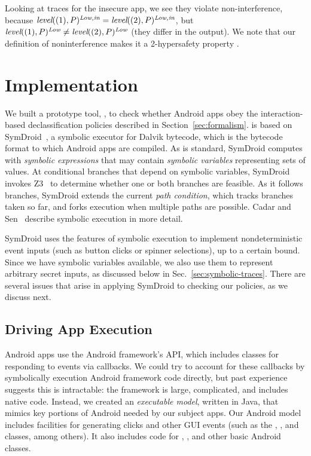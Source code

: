Looking at traces for the insecure app, we see
they violate non-interference, because
$\textit{level}((1), P)^\textit{Low,in} =
\textit{level}((2), P)^\textit{Low,in}$, but
$\textit{level}((1), P)^\textit{Low} \neq \textit{level}((2), P)^\textit{Low}$
(they differ in the output).  We note that our definition of
noninterference makes it a 2-hypersafety property \cite{Clarkson:10,Clarkson:2014}.

\section{Implementation}
\label{sec:implementation}

We built a prototype tool, \toolname{}, to check whether Android apps obey the
interaction-based declassification policies described in
Section~\ref{sec:formalism}. \toolname{} is based on
SymDroid~\cite{Jeon:2012}, a symbolic executor for Dalvik bytecode,
which is the bytecode format to which Android apps are compiled.
As is standard, SymDroid computes with \emph{symbolic
  expressions} that may contain \emph{symbolic variables}
representing sets of values. At conditional branches that depend on
symbolic variables, SymDroid invokes Z3~\cite{deMoura:2008} to
determine whether one or both branches are feasible. As it follows
branches, SymDroid extends the current \emph{path condition}, which tracks
branches taken so far, and forks execution when multiple paths are
possible. Cadar and Sen~\cite{Cadar:13} describe
symbolic execution in more detail.

SymDroid uses the features of symbolic execution to implement
nondeterministic event inputs (such as button clicks or spinner
selections), up to a certain bound. Since we have symbolic variables
available, we also use them to represent arbitrary secret inputs, as
discussed below in Sec.~\ref{sec:symbolic-traces}. There are several issues that arise in applying SymDroid
to checking our policies, as we discuss next.

\subsection{Driving App Execution}
\label{sec:driver}

Android apps use the Android framework's API, which includes
classes for responding to events via callbacks. We could try to
account for these callbacks by symbolically execution Android framework code
directly, but past experience suggests this is intractable: the
framework is large, complicated, and includes native code.
Instead, we created an \emph{executable model}, written in Java, that
mimics key portions of Android needed by our subject apps. Our Android
model includes facilities for generating clicks and
other GUI events (such as the , , and
 classes, among others). It also includes code for
,
, and other basic Android classes.

